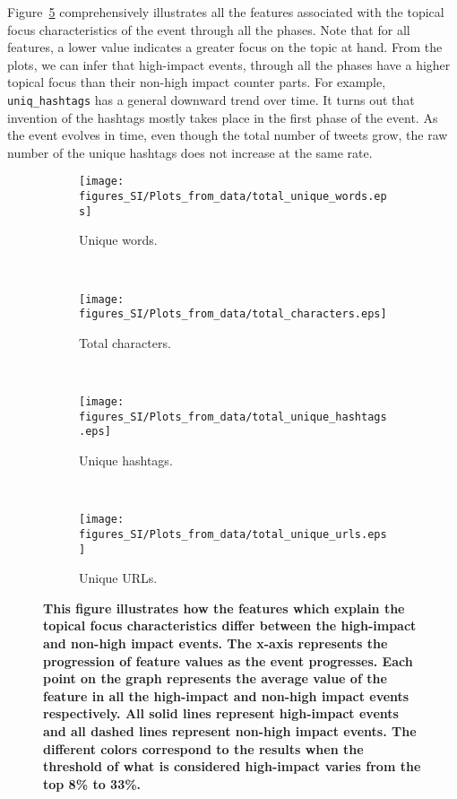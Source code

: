 Figure~\ref{fig:topical_focus_hypothesis} comprehensively illustrates
all the features associated with the topical focus characteristics of
the event through all the phases. Note that for all features, a lower
value indicates a greater focus on the topic at hand. From the plots,
we can infer that high-impact events, through all the phases have a
higher topical focus than their non-high impact counter parts. For example,
\texttt{uniq\_hashtags} has a general downward trend over time. It turns
out that invention of the hashtags mostly takes place in the first
phase of the event. As the event evolves in time, even though the
total number of tweets grow, the raw number of the unique hashtags
does not increase at the same rate.
\label{subsec:topical_focus}
\begin{figure}[h]
  \centering
  \begin{subfigure}[h]{0.45\textwidth}
    \texttt{[image: figures\_SI/Plots\_from\_data/total\_unique\_words.eps]}
    \caption{Unique words.} \label{fig:feat_uniq_words}
  \end{subfigure}
  ~ %
  \begin{subfigure}[h]{0.45\textwidth}
    \texttt{[image: figures\_SI/Plots\_from\_data/total\_characters.eps]}
    \caption{Total characters.} \label{fig:feat_characters}
  \end{subfigure} ~ %

  \begin{subfigure}[h]{0.45\textwidth}
    \texttt{[image: figures\_SI/Plots\_from\_data/total\_unique\_hashtags.eps]}
    \caption{Unique hashtags.} \label{fig:feat_uniq_hashtags}
  \end{subfigure}
  ~
  \begin{subfigure}[h]{0.45\textwidth}
    \texttt{[image: figures\_SI/Plots\_from\_data/total\_unique\_urls.eps]}
    \caption{Unique URLs.} \label{fig:feat_uniq_urls}
  \end{subfigure}
  \caption{\textbf{This figure illustrates how the features which
      explain the topical focus characteristics differ between the
      high-impact and non-high impact events. The x-axis represents
      the progression of feature values as the event progresses. Each
      point on the graph represents the average value of the feature
      in all the high-impact and non-high impact events respectively.
      All solid lines represent high-impact events and all dashed
      lines represent non-high impact events. The different colors
      correspond to the results when the threshold of what is
      considered high-impact varies from the top 8\% to 33\%. }}
  \label{fig:topical_focus_hypothesis}
\end{figure}

